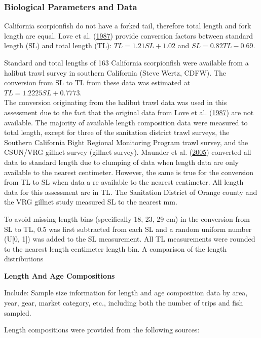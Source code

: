 \documentclass[12pt,]{article}
\begin{document}
\subsubsection{Biological Parameters and
Data}\label{biological-parameters-and-data}

California scorpionfish do not have a forked tail, therefore total
length and fork length are equal. Love et al.
(\protect\hyperlink{ref-Love1987}{1987}) provide conversion factors
between standard length (SL) and total length (TL):
\(TL = 1.21SL + 1.02\) and \(SL = 0.82TL - 0.69\).

Standard and total lengths of 163 California scorpionfish were available
from a halibut trawl survey in southern California (Steve Wertz, CDFW).
The conversion from SL to TL from these data was estimated at
\(TL = 1.2225SL + 0.7773\).\\
The conversion originating from the halibut trawl data was used in this
assessment due to the fact that the original data from Love et al.
(\protect\hyperlink{ref-Love1987}{1987}) are not available. The majority
of available length composition data were measured to total length,
except for three of the sanitation district trawl surveys, the Southern
California Bight Regional Monitoring Program trawl survey, and the
CSUN/VRG gillnet survey (gillnet survey). Maunder et al.
(\protect\hyperlink{ref-Maunder2005}{2005}) converted all data to
standard length due to clumping of data when length data are only
available to the nearest centimeter. However, the same is true for the
conversion from TL to SL when data a re available to the nearest
centimeter. All length data for this assessment are in TL. The
Sanitation District of Orange county and the VRG gillnet study measured
SL to the nearest mm.

To avoid missing length bins (specifically 18, 23, 29 cm) in the
conversion from SL to TL, 0.5 was first subtracted from each SL and a
random uniform number (U{[}0, 1{]}) was added to the SL measurement. All
TL measurements were rounded to the nearest length centimeter length
bin. A comparison of the length distributions

\textbf{Length And Age Compositions}

Include: Sample size information for length and age composition data by
area, year, gear, market category, etc., including both the number of
trips and fish sampled.

Length compositions were provided from the following sources:
\end{document}
